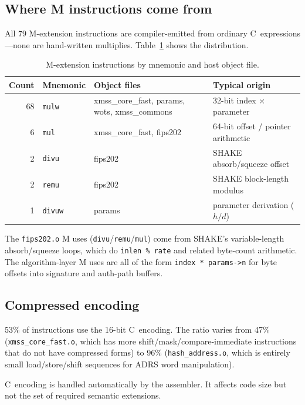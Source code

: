 \documentclass[11pt,a4paper]{article}
\begin{document}
\subsection{Where M instructions come from}

All 79 M-extension instructions are compiler-emitted from ordinary
C~expressions---none are hand-written multiplies.  Table~\ref{tab:m-detail}
shows the distribution.

\begin{table}[ht]
\centering
\caption{M-extension instructions by mnemonic and host object file.}
\label{tab:m-detail}
\begin{tabular}{@{}rlll@{}}
\toprule
Count & Mnemonic & Object files & Typical origin \\
\midrule
 68 & \texttt{mulw}  & xmss\_core\_fast, params, wots, xmss\_commons & 32-bit index $\times$ parameter \\
  6 & \texttt{mul}   & xmss\_core\_fast, fips202 & 64-bit offset / pointer arithmetic \\
  2 & \texttt{divu}  & fips202 & SHAKE absorb/squeeze offset \\
  2 & \texttt{remu}  & fips202 & SHAKE block-length modulus \\
  1 & \texttt{divuw} & params & parameter derivation ($h/d$) \\
\bottomrule
\end{tabular}
\end{table}

The \texttt{fips202.o} M uses (\texttt{divu}/\texttt{remu}/\texttt{mul})
come from SHAKE's variable-length absorb/squeeze loops, which do
\texttt{inlen \% rate} and related byte-count arithmetic.  The
algorithm-layer M uses are all of the form \texttt{index * params->n}
for byte offsets into signature and auth-path buffers.

\subsection{Compressed encoding}

53\% of instructions use the 16-bit C~encoding.  The ratio varies from
47\% (\texttt{xmss\_core\_fast.o}, which has more
shift/mask/compare-immediate instructions that do not have compressed
forms) to 96\% (\texttt{hash\_address.o}, which is entirely small
load/store/shift sequences for ADRS word manipulation).

C~encoding is handled automatically by the assembler.  It affects code
size but not the set of required semantic extensions.
\end{document}
